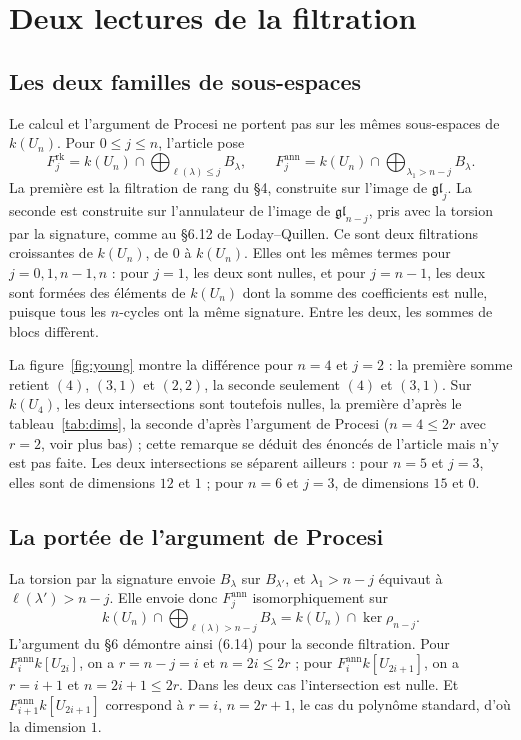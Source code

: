 \documentclass[11pt,a4paper]{amsart}
\theoremstyle{definition}
\theoremstyle{plain}
\theoremstyle{remark}
\newcommand{\gl}{\mathfrak{gl}}
\begin{document}
\section{Deux lectures de la filtration}

\subsection{Les deux familles de sous-espaces}

Le calcul et l'argument de Procesi ne portent pas sur les mêmes sous-espaces de $k(U_n)$. Pour $0 \le j \le n$, l'article pose
\[
F^{\mathrm{rk}}_j = k(U_n) \cap \bigoplus_{\ell(\lambda) \le j} B_\lambda, \qquad
F^{\mathrm{ann}}_j = k(U_n) \cap \bigoplus_{\lambda_1 > n-j} B_\lambda .
\]
La première est la filtration de rang du \S4, construite sur l'image de $\gl_j$. La seconde est construite sur l'annulateur de l'image de $\gl_{n-j}$, pris avec la torsion par la signature, comme au \S6.12 de Loday--Quillen. Ce sont deux filtrations croissantes de $k(U_n)$, de $0$ à $k(U_n)$. Elles ont les mêmes termes pour $j = 0, 1, n-1, n$ : pour $j = 1$, les deux sont nulles, et pour $j = n-1$, les deux sont formées des éléments de $k(U_n)$ dont la somme des coefficients est nulle, puisque tous les $n$-cycles ont la même signature. Entre les deux, les sommes de blocs diffèrent.

La figure~\ref{fig:young} montre la différence pour $n = 4$ et $j = 2$ : la première somme retient $(4)$, $(3,1)$ et $(2,2)$, la seconde seulement $(4)$ et $(3,1)$. Sur $k(U_4)$, les deux intersections sont toutefois nulles, la première d'après le tableau~\ref{tab:dims}, la seconde d'après l'argument de Procesi ($n = 4 \le 2r$ avec $r = 2$, voir plus bas) ; cette remarque se déduit des énoncés de l'article mais n'y est pas faite. Les deux intersections se séparent ailleurs : pour $n = 5$ et $j = 3$, elles sont de dimensions $12$ et $1$ ; pour $n = 6$ et $j = 3$, de dimensions $15$ et $0$.

\subsection{La portée de l'argument de Procesi}

La torsion par la signature envoie $B_\lambda$ sur $B_{\lambda'}$, et $\lambda_1 > n - j$ équivaut à $\ell(\lambda') > n - j$. Elle envoie donc $F^{\mathrm{ann}}_j$ isomorphiquement sur
\[
k(U_n) \cap \bigoplus_{\ell(\lambda) > n-j} B_\lambda = k(U_n) \cap \ker \rho_{n-j}.
\]
L'argument du \S6 démontre ainsi (6.14) pour la seconde filtration. Pour $F^{\mathrm{ann}}_i k[U_{2i}]$, on a $r = n - j = i$ et $n = 2i \le 2r$ ; pour $F^{\mathrm{ann}}_i k[U_{2i+1}]$, on a $r = i + 1$ et $n = 2i + 1 \le 2r$. Dans les deux cas l'intersection est nulle. Et $F^{\mathrm{ann}}_{i+1} k[U_{2i+1}]$ correspond à $r = i$, $n = 2r + 1$, le cas du polynôme standard, d'où la dimension $1$.
\end{document}
